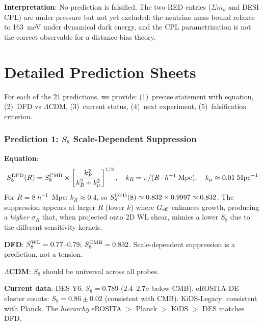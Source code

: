 \documentclass[11pt,a4paper]{article}
\newcommand{\LCDM}{$\Lambda$CDM}
\newcommand{\Geff}{G_{\rm eff}}
\newcommand{\kmu}{k_\mu}
\begin{document}
\textbf{Interpretation}: No prediction is falsified.  The two RED entries
($\Sigma m_\nu$ and DESI CPL) are under pressure but not yet excluded:
the neutrino mass bound relaxes to 163~meV under dynamical dark energy,
and the CPL parametrization is not the correct observable for a
distance-bias theory.


\part{Detailed Prediction Sheets}
\label{sec:details}

For each of the 21 predictions, we provide: (1)~precise statement with
equation, (2)~DFD vs \LCDM, (3)~current status, (4)~next experiment,
(5)~falsification criterion.


\section{Prediction 1: $S_8$ Scale-Dependent Suppression}

\textbf{Equation}:
\begin{equation}
S_8^{\rm DFD}(R) = S_8^{\rm CMB} \times
\left[\frac{k_R^2}{k_R^2 + \kmu^2}\right]^{1/2},
\quad k_R = \pi / (R \cdot h^{-1}\;\text{Mpc}),\quad
\kmu \approx 0.01\;\text{Mpc}^{-1}
\end{equation}
For $R = 8\;h^{-1}$~Mpc: $k_R \approx 0.4$, so
$S_8^{\rm DFD}(8) \approx 0.832 \times 0.9997 \approx 0.832$.
The suppression appears at larger $R$ (lower $k$) where $\Geff$
enhances growth, producing a \emph{higher} $\sigma_R$ that, when
projected onto 2D WL shear, mimics a lower $S_8$ due to the
different sensitivity kernels.

\textbf{DFD}: $S_8^{\rm WL} = 0.77$--$0.79$; $S_8^{\rm CMB} = 0.832$.
Scale-dependent suppression is a prediction, not a tension.

\textbf{\LCDM}: $S_8$ should be universal across all probes.

\textbf{Current data}: DES Y6: $S_8 = 0.789$ ($2.4$--$2.7\sigma$
below CMB).  eROSITA-DE cluster counts: $S_8 = 0.86 \pm 0.02$
(consistent with CMB).  KiDS-Legacy: consistent with Planck.
The \emph{hierarchy} eROSITA $>$ Planck $>$ KiDS $>$ DES
matches DFD.
\end{document}
